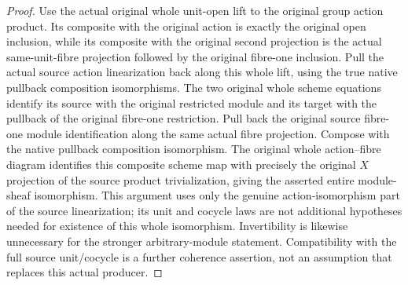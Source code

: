 \begin{proof}
Use the actual original whole unit-open lift to the original group
action product. Its composite with the original action is exactly
the original open inclusion, while its composite with the original
second projection is the actual same-unit-fibre projection followed
by the original fibre-one inclusion. Pull the actual source
action linearization back along this whole lift, using the true
native pullback composition isomorphisms. The two original whole
scheme equations identify its source with the original restricted
module and its target with the pullback of the original fibre-one
restriction. Pull back the original source fibre-one module
identification along the same actual fibre projection. Compose
with the native pullback composition isomorphism. The original
whole action--fibre diagram identifies this composite scheme map
with precisely the original $X$ projection of the source product
trivialization, giving the asserted entire module-sheaf isomorphism.
This argument uses only the genuine action-isomorphism part of
the source linearization; its unit and cocycle laws are not
additional hypotheses needed for existence of this whole
isomorphism. Invertibility is likewise unnecessary for the
stronger arbitrary-module statement. Compatibility with the
full source unit/cocycle is a further coherence assertion,
not an assumption that replaces this actual producer.
\end{proof}
